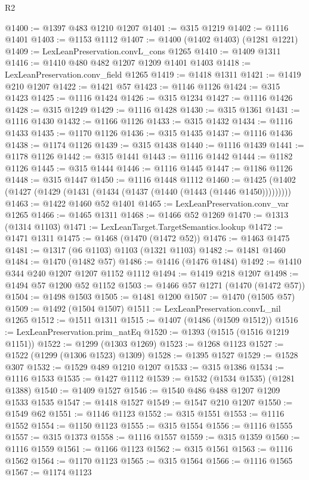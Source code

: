 \begin{lexlean}{R2}
\begin{coremodule}
@1400 := @1397 @483 @1210 @1207
@1401 := @315 @1219
@1402 := @1116 @1401
@1403 := @1153 @1112
@1407 := @1400 (@1402 @1403) (@1281 @1221)
@1409 := LexLeanPreservation.convL_cons @1265
@1410 := @1409 @1311
@1416 := @1410 @480 @482 @1207 @1209 @1401 @1403
@1418 := LexLeanPreservation.conv_field @1265
@1419 := @1418 @1311
@1421 := @1419 @210 @1207
@1422 := @1421 @57
@1423 := @1146 @1126
@1424 := @315 @1423
@1425 := @1116 @1424
@1426 := @315 @1234
@1427 := @1116 @1426
@1428 := @315 @1249
@1429 := @1116 @1428
@1430 := @315 @1361
@1431 := @1116 @1430
@1432 := @1166 @1126
@1433 := @315 @1432
@1434 := @1116 @1433
@1435 := @1170 @1126
@1436 := @315 @1435
@1437 := @1116 @1436
@1438 := @1174 @1126
@1439 := @315 @1438
@1440 := @1116 @1439
@1441 := @1178 @1126
@1442 := @315 @1441
@1443 := @1116 @1442
@1444 := @1182 @1126
@1445 := @315 @1444
@1446 := @1116 @1445
@1447 := @1186 @1126
@1448 := @315 @1447
@1450 := @1116 @1448 @1112
@1460 := @1425 (@1402 (@1427 (@1429 (@1431 (@1434 (@1437 (@1440 (@1443 (@1446 @1450)))))))))
@1463 := @1422 @1460 @52 @1401
@1465 := LexLeanPreservation.conv_var @1265
@1466 := @1465 @1311
@1468 := @1466 @52 @1269
@1470 := @1313 (@1314 @1103)
@1471 := LexLeanTarget.TargetSemantics.lookup
@1472 := @1471 @1311
@1475 := @1468 (@1470 (@1472 @52))
@1476 := @1463 @1475
@1481 := @1317 (@6 @1103) @1103 (@1321 @1103)
@1482 := @1481 @1460
@1484 := @1470 (@1482 @57)
@1486 := @1416 (@1476 @1484)
@1492 := @1410 @344 @240 @1207 @1207 @1152 @1112
@1494 := @1419 @218 @1207
@1498 := @1494 @57 @1200 @52 @1152
@1503 := @1466 @57 @1271 (@1470 (@1472 @57))
@1504 := @1498 @1503
@1505 := @1481 @1200
@1507 := @1470 (@1505 @57)
@1509 := @1492 (@1504 @1507)
@1511 := LexLeanPreservation.convL_nil @1265
@1512 := @1511 @1311
@1515 := @1407 (@1486 (@1509 @1512))
@1516 := LexLeanPreservation.prim_natEq
@1520 := @1393 (@1515 (@1516 @1219 @1151))
@1522 := @1299 (@1303 @1269)
@1523 := @1268 @1123
@1527 := @1522 (@1299 (@1306 @1523) @1309)
@1528 := @1395 @1527
@1529 := @1528 @307
@1532 := @1529 @489 @1210 @1207
@1533 := @315 @1386
@1534 := @1116 @1533
@1535 := @1427 @1112
@1539 := @1532 (@1534 @1535) (@1281 @1388)
@1540 := @1409 @1527
@1546 := @1540 @486 @488 @1207 @1209 @1533 @1535
@1547 := @1418 @1527
@1549 := @1547 @210 @1207
@1550 := @1549 @62
@1551 := @1146 @1123
@1552 := @315 @1551
@1553 := @1116 @1552
@1554 := @1150 @1123
@1555 := @315 @1554
@1556 := @1116 @1555
@1557 := @315 @1373
@1558 := @1116 @1557
@1559 := @315 @1359
@1560 := @1116 @1559
@1561 := @1166 @1123
@1562 := @315 @1561
@1563 := @1116 @1562
@1564 := @1170 @1123
@1565 := @315 @1564
@1566 := @1116 @1565
@1567 := @1174 @1123

\end{coremodule}
\end{lexlean}
